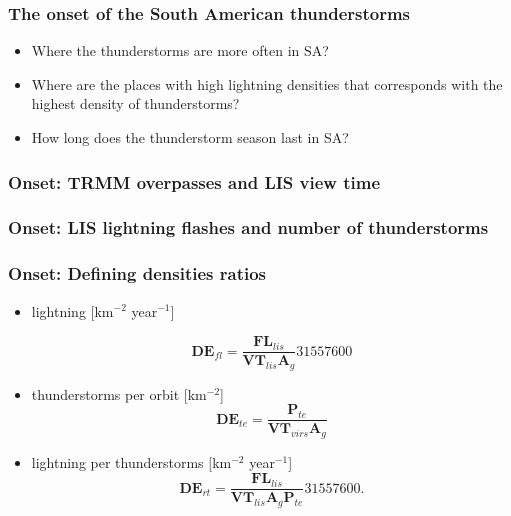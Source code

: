 \documentclass[smaller]{beamer}
\begin{document}
\begin{frame}
\frametitle{The onset of the South American thunderstorms}

\begin{itemize}
\item Where the thunderstorms are more often in SA?
\item Where are the places with high lightning densities that corresponds with the highest density of thunderstorms?
\item How long does the thunderstorm season last in SA?
\end{itemize}

\end{frame}

\begin{frame}
\frametitle{Onset: TRMM overpasses and LIS view time}

\end{frame}

\begin{frame}
\frametitle{Onset: LIS lightning flashes and number of thunderstorms}

\end{frame}


\begin{frame}
\frametitle{Onset: Defining densities ratios}
\Large
\begin{itemize}
\item lightning [km$^{-2}$ year$^{-1}$]

\begin{equation}
\mathbf{DE}_{fl} = \frac{\mathbf{FL}_{lis}}{\mathbf{VT}_{lis} \mathbf{A}_g} 31557600     
\label{defl}
\end{equation}

\item thunderstorms per orbit [km$^{-2}$]
\begin{equation}
\mathbf{DE}_{te} = \frac{\mathbf{P}_{te}}{\mathbf{VT}_{virs} \mathbf{A}_g}    
\label{dete}
\end{equation}

\item lightning per thunderstorms [km$^{-2}$ year$^{-1}$]
\begin{equation}
\mathbf{DE}_{rt} = \frac{\mathbf{FL}_{lis}}{\mathbf{VT}_{lis} \mathbf{A}_g\mathbf{P}_{te}} 31557600.  
\label{dert}
\end{equation}
\end{itemize}

\end{frame}
\end{document}
